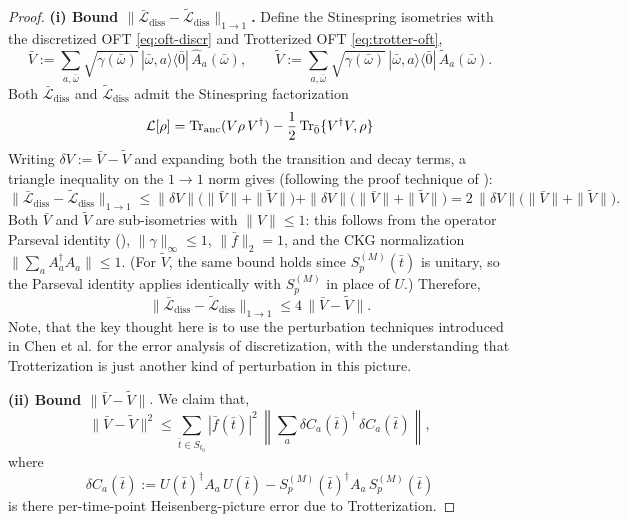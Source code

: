 \begin{proof}
    \noindent\textbf{(i) Bound $\bigl\|\bar{\mathcal{L}}_{\mathrm{diss}} - \tilde{\mathcal{L}}_{\mathrm{diss}}\bigr\|_{1 \to 1}$.}
    Define the Stinespring isometries with the discretized OFT \eqref{eq:oft-discr} and Trotterized OFT \eqref{eq:trotter-oft}, 
    $$
    \bar{V} := \sum_{a,\bar{\omega}} \sqrt{\gamma(\bar{\omega})}\, |\bar{\omega}, a\rangle\langle \bar{0}|\, \hat{A}_a(\bar{\omega}), \qquad
    \tilde{V} := \sum_{a,\bar{\omega}} \sqrt{\gamma(\bar{\omega})}\, |\bar{\omega}, a\rangle\langle \bar{0}|\, \tilde{A}_a(\bar{\omega}).
    $$
    Both $\mathcal{\bar{L}}_\text{diss}$ and $\mathcal{\tilde{L}}_\text{diss}$ admit the Stinespring factorization 
    $$
    \mathcal{L}[{\rho}] = \operatorname{Tr}_{\mathrm{anc}}(V \rho\, V^\dagger) - \frac{1}{2}\operatorname{Tr}_{\bar{0}}\{V^\dagger V, \rho\}
    $$
    Writing $\delta V := \bar{V} - \tilde{V}$ and expanding both the transition and decay terms, a triangle inequality on the $1 \to 1$ norm gives (following the proof technique of \cite[Lemma A.1]{chen2023quantum}):
    $$
    \bigl\|\bar{\mathcal{L}}_{\mathrm{diss}} - \tilde{\mathcal{L}}_{\mathrm{diss}}\bigr\|_{1 \to 1}
    \leq \|\delta V\|\bigl(\|\bar{V}\| + \|\tilde{V}\|\bigr) + \|\delta V\|\bigl(\|\bar{V}\| + \|\tilde{V}\|\bigr) = 2\,\|\delta V\|\bigl(\|\bar{V}\| + \|\tilde{V}\|\bigr).
    $$
    Both $\bar{V}$ and $\tilde{V}$ are sub-isometries with $\|V\| \leq 1$: this follows from the operator Parseval identity (\cite[Proposition A.1]{chen2023quantum}), $\|\gamma\|_\infty \leq 1$, $\|\bar{f}\|_2 = 1$, and the CKG normalization $\|\sum_a A_a^\dagger A_a\| \leq 1$. (For $\tilde{V}$, the same bound holds since $S_p^{(M)}(\bar{t})$ is unitary, so the Parseval identity applies identically with $S_p^{(M)}$ in place of $U$.) Therefore,
    $$
    \bigl\|\bar{\mathcal{L}}_{\mathrm{diss}} - \tilde{\mathcal{L}}_{\mathrm{diss}}\bigr\|_{1 \to 1}
    \leq 4\,\|\bar{V} - \tilde{V}\|.
    $$
    Note, that the key thought here is to use the perturbation techniques introduced in Chen et al. for the error analysis of discretization, with the understanding that Trotterization is just another kind of perturbation in this picture.

    \medskip
    \noindent\textbf{(ii) Bound $\|\bar{V} - \tilde{V}\|$}. We claim that,
    $$
    \|\bar{V} - \tilde{V}\|^2 \leq \sum_{\bar{t} \in S_{t_0}} |\bar{f}(\bar{t})|^2 \, \left\|\sum_a \delta C_a(\bar{t})^\dagger\, \delta C_a(\bar{t})\right\|,
    $$
    where
    $$
    \delta C_a(\bar{t}) := U(\bar{t})^\dagger A_a\, U(\bar{t}) - S_p^{(M)}(\bar{t})^\dagger A_a\, S_p^{(M)}(\bar{t})
    $$
    is there per-time-point Heisenberg-picture error due to Trotterization.


\end{proof}
